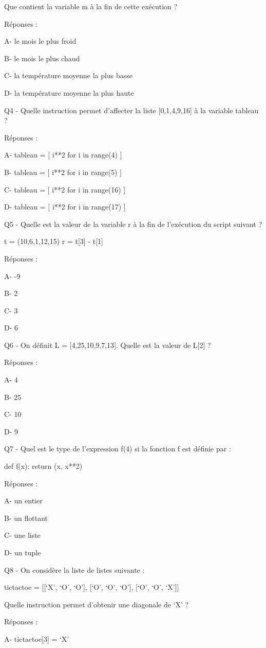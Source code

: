 \documentclass[
]{book}
\begin{document}
Que contient la variable m à la fin de cette exécution ?

Réponses :

A- le mois le plus froid

B- le mois le plus chaud

C- la température moyenne la plus basse

D- la température moyenne la plus haute

Q4 - Quelle instruction permet d'affecter la liste {[}0,1,4,9,16{]} à la variable tableau ?

Réponses :

A- tableau = {[} i**2 for i in range(4) {]}

B- tableau = {[} i**2 for i in range(5) {]}

C- tableau = {[} i**2 for i in range(16) {]}

D- tableau = {[} i**2 for i in range(17) {]}

Q5 - Quelle est la valeur de la variable r à la fin de l'exécution du script suivant ?

t = (10,6,1,12,15)
r = t{[}3{]} - t{[}1{]}

Réponses :

A- -9

B- 2

C- 3

D- 6

Q6 - On définit L = {[}4,25,10,9,7,13{]}. Quelle est la valeur de L{[}2{]} ?

Réponses :

A- 4

B- 25

C- 10

D- 9

Q7 - Quel est le type de l'expression f(4) si la fonction f est définie par :

def f(x):
return (x, x**2)

Réponses :

A- un entier

B- un flottant

C- une liste

D- un tuple

Q8 - On considère la liste de listes suivante :

tictactoe = {[}{[}`X', `O', `O'{]},
{[}`O', `O', `O'{]},
{[}`O', `O', `X'{]}{]}

Quelle instruction permet d'obtenir une diagonale de `X' ?

Réponses :

A- tictactoe{[}3{]} = `X'
\end{document}
